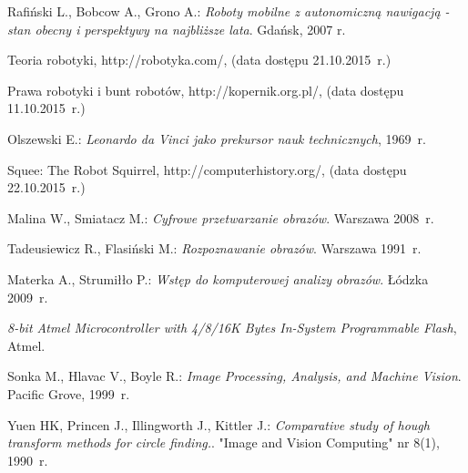 \begin{thebibliography}{9}

Rafiński L., Bobcow A., Grono A.: \emph{Roboty mobilne z autonomiczną nawigacją - stan obecny i perspektywy na najbliższe lata}. Gdańsk, 2007 r.  

Teoria robotyki, http://robotyka.com/, (data dostępu 21.10.2015~r.)

Prawa robotyki i bunt robotów, http://kopernik.org.pl/, (data dostępu 11.10.2015~r.)

Olszewski E.: \emph{Leonardo da Vinci jako prekursor nauk technicznych}, 1969~r.

Squee: The Robot Squirrel, http://computerhistory.org/, (data dostępu 22.10.2015~r.)

Malina W., Smiatacz M.: \emph{Cyfrowe przetwarzanie obrazów}. Warszawa 2008~r.

Tadeusiewicz R., Flasiński M.: \emph{Rozpoznawanie obrazów}. Warszawa 1991~r.

Materka A., Strumiłło P.: \emph{Wstęp do komputerowej analizy obrazów}. Łódzka 2009~r.

\emph{8-bit Atmel Microcontroller with 4/8/16K Bytes In-System Programmable Flash}, Atmel.

Sonka M., Hlavac V., Boyle R.: \emph{Image Processing, Analysis, and Machine Vision}. Pacific Grove, 1999~r.

Yuen HK, Princen J., Illingworth J., Kittler J.: \emph{Comparative study of hough transform methods for circle finding.}. "Image and Vision Computing" nr 8(1), 1990~r.

\end{thebibliography}
